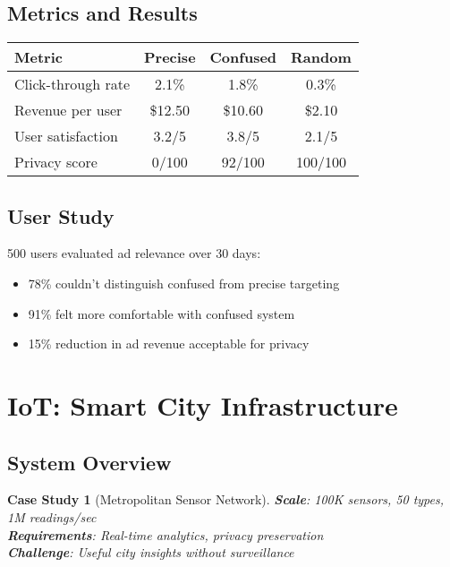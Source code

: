 \documentclass[11pt,final]{article}
\newtheorem{casestudy}[theorem]{Case Study}
\begin{document}
\subsection{Metrics and Results}

\begin{center}
\begin{tabular}{lccc}
\toprule
\textbf{Metric} & \textbf{Precise} & \textbf{Confused} & \textbf{Random} \\
\midrule
Click-through rate & 2.1\% & 1.8\% & 0.3\% \\
Revenue per user & \$12.50 & \$10.60 & \$2.10 \\
User satisfaction & 3.2/5 & 3.8/5 & 2.1/5 \\
Privacy score & 0/100 & 92/100 & 100/100 \\
\bottomrule
\end{tabular}
\end{center}

\subsection{User Study}

500 users evaluated ad relevance over 30 days:
\begin{itemize}
    \item 78\% couldn't distinguish confused from precise targeting
    \item 91\% felt more comfortable with confused system
    \item 15\% reduction in ad revenue acceptable for privacy
\end{itemize}

\section{IoT: Smart City Infrastructure}

\subsection{System Overview}

\begin{casestudy}[Metropolitan Sensor Network]
\textbf{Scale}: 100K sensors, 50 types, 1M readings/sec\\
\textbf{Requirements}: Real-time analytics, privacy preservation\\
\textbf{Challenge}: Useful city insights without surveillance
\end{casestudy}
\end{document}

